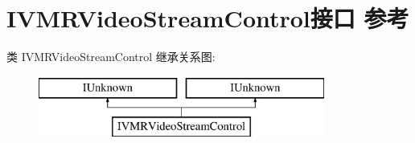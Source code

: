\hypertarget{interface_i_v_m_r_video_stream_control}{}\section{I\+V\+M\+R\+Video\+Stream\+Control接口 参考}
\label{interface_i_v_m_r_video_stream_control}
类 I\+V\+M\+R\+Video\+Stream\+Control 继承关系图\+:\begin{figure}[H]
\begin{center}
\leavevmode
\includegraphics[height=2.000000cm]{interface_i_v_m_r_video_stream_control}
\end{center}
\end{figure}
